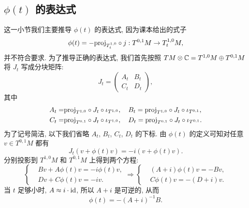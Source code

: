     \subsection{$\phi(t)$ 的表达式}
    这一小节我们主要推导 $\phi(t)$ 的表达式, 因为课本给出的式子
    \begin{equation*}
        \phi(t) = -\mathrm{proj}_{T^{1,0}_t}\circ j: T^{0,1}M\rightarrow T^{1,0}_tM,
    \end{equation*}
    并不符合要求. 为了推导正确的表达式, 
    我们首先按照 $TM\otimes\mathbb{C} = T^{1,0}M\oplus T^{0,1}M$ 将 $J_t$ 写成分块矩阵:
    \begin{equation*}
        J_t = \begin{pmatrix} A_t & B_t \\ C_t & D_t \end{pmatrix},
    \end{equation*}
    其中
    \begin{align*}
        A_t = &\mathrm{proj}_{T^{1,0}}\circ J_t\circ\iota_{T^{1,0}}, \quad 
        B_t = \mathrm{proj}_{T^{1,0}}\circ J_t\circ\iota_{T^{0,1}}, \\
        C_t = &\mathrm{proj}_{T^{0,1}}\circ J_t\circ\iota_{T^{1,0}}, \quad
        D_t = \mathrm{proj}_{T^{0,1}}\circ J_t\circ\iota_{T^{0,1}}.
    \end{align*}
    为了记号简洁, 以下我们省略 $A_t$, $B_t$, $C_t$, $D_t$ 的下标. 由 $\phi(t)$ 的定义可知对任意 $v\in T^{0,1}M$ 都有
    \begin{equation*}
        J_t(v+\phi(t)v) = -i(v+\phi(t)v).
    \end{equation*}
    分别投影到 $T^{1,0}M$ 和 $T^{0,1}M$ 上得到两个方程:
    \begin{equation*}
        \left\{
        \begin{aligned}
            &Bv + A\phi(t)v = -i\phi(t)v, \\
            &Dv + C\phi(t)v = -i v.
        \end{aligned}
        \right.\Rightarrow
        \left\{
        \begin{aligned}
            &(A + i)\phi(t)v = -Bv, \\
            &C\phi(t)v = -(D + i)v.
        \end{aligned}
        \right.
    \end{equation*}
    当 $t$ 足够小时, $A\approx i\cdot{\rm id}$, 所以 $A + i$ 是可逆的, 从而
    \begin{equation}\label{eq:phi(t)}
        \phi(t) = -(A + i)^{-1}B.
    \end{equation}
